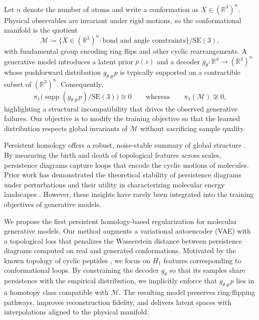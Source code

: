 \documentclass[11pt]{article}
\begin{document}
Let $n$ denote the number of atoms and write a conformation as $X \in (\mathbb{R}^3)^n$. Physical observables are invariant under rigid motions, so the conformational manifold is the quotient
\begin{equation}
    \mathcal{M} \coloneqq \big\{ X \in (\mathbb{R}^3)^n : \text{bond and angle constraints} \big\} / \mathrm{SE}(3),
    \label{eq:manifold}
\end{equation}
with fundamental group encoding ring flips and other cyclic rearrangements. A generative model introduces a latent prior $p(z)$ and a decoder $g_\theta : \mathbb{R}^d \to (\mathbb{R}^3)^n$ whose pushforward distribution $g_{\theta\,\#}p$ is typically supported on a contractible subset of $(\mathbb{R}^3)^n$. Consequently,
\begin{equation}
    \pi_1\big( \operatorname{supp}(g_{\theta\,\#}p) / \mathrm{SE}(3) \big) \cong 0 \qquad \text{whereas} \qquad \pi_1(\mathcal{M}) \not\cong 0,
    \label{eq:fundamental-group-mismatch}
\end{equation}
highlighting a structural incompatibility that drives the observed generative failures. Our objective is to modify the training objective so that the learned distribution respects global invariants of $\mathcal{M}$ without sacrificing sample quality.

Persistent homology offers a robust, noise-stable summary of global structure \cite{edelsbrunner2010computational, carlsson2009topology}. By measuring the birth and death of topological features across scales, persistence diagrams capture loops that encode the cyclic motions of molecules. Prior work has demonstrated the theoretical stability of persistence diagrams under perturbations \cite{cohen2007stability} and their utility in characterizing molecular energy landscapes \cite{carlsson2009topology, sommers2023tda}. However, these insights have rarely been integrated into the training objectives of generative models.

We propose the first persistent homology-based regularization for molecular generative models. Our method augments a variational autoencoder (VAE) with a topological loss that penalizes the Wasserstein distance between persistence diagrams computed on real and generated conformations. Motivated by the known topology of cyclic peptides \cite{wales2001microscopic, shaw2010atomic}, we focus on $H_1$ features corresponding to conformational loops. By constraining the decoder $g_\theta$ so that its samples share persistence with the empirical distribution, we implicitly enforce that $g_{\theta\,\#}p$ lies in a homotopy class compatible with $\mathcal{M}$. The resulting model preserves ring-flipping pathways, improves reconstruction fidelity, and delivers latent spaces with interpolations aligned to the physical manifold.
\end{document}
